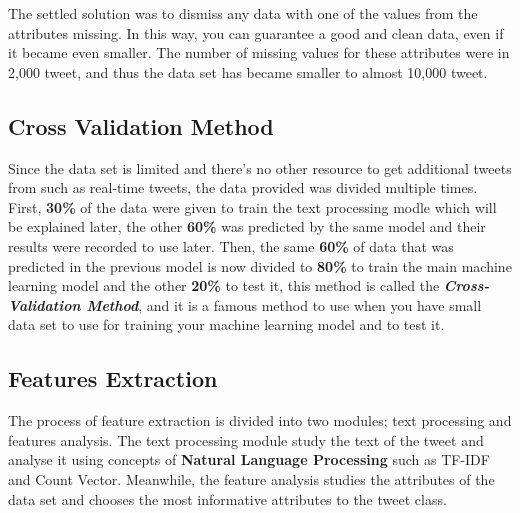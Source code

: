 \documentclass[conference]{IEEEtran}
\begin{document}
The settled solution was to dismiss any data with one of the values from the attributes missing. In this way, you can guarantee a good and clean data, even if it became even smaller. The number of missing values for these attributes were in 2,000 tweet, and thus the data set has became smaller to almost 10,000 tweet.

\subsection{Cross Validation Method}

Since the data set is limited and there's no other resource to get additional tweets from such as real-time tweets, the data provided was divided multiple times. First, \textbf{30\%} of the data were given to train the text processing modle which will be explained later, the other \textbf{60\%} was predicted by the same model and their results were recorded to use later. Then, the same \textbf{60\%} of data that was predicted in the previous model is now divided to \textbf{80\%} to train the main machine learning model and the other \textbf{20\%} to test it, this method is called the \textbf{\textit{Cross-Validation Method}}, and it is a famous method to use when you have small data set to use for training your machine learning model and to test it.

\subsection{Features Extraction}
The process of feature extraction is divided into two modules; text processing and features analysis. The text processing module study the text of the tweet and analyse it using concepts of \textbf{Natural Language Processing} such as TF-IDF and Count Vector. Meanwhile, the feature analysis studies the attributes of the data set and chooses the most informative attributes to the tweet class.
\end{document}

